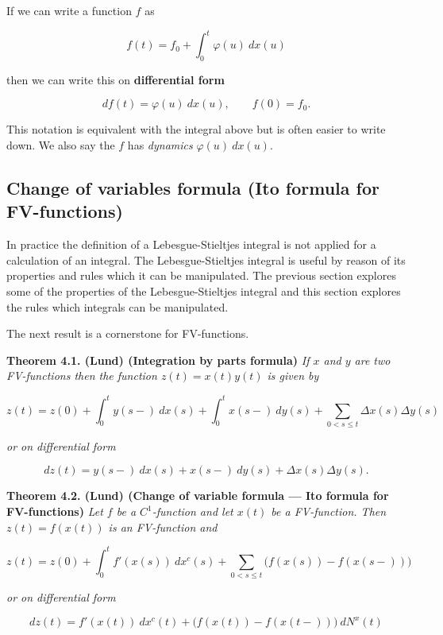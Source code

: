 \documentclass[a4paper,10pt,openany]{book}
\begin{document}
If we can write a function \(f\) as

\[
f(t)=f_0+\int_0^t\varphi(u)\ dx(u)
\]

then we can write this on \textbf{differential form}

\[
df(t)=\varphi(u)\ dx(u),\qquad f(0)=f_0.
\]

This notation is equivalent with the integral above but is often easier to write down. We also say the \(f\) has \emph{dynamics} \(\varphi(u)\ dx(u)\).

\hypertarget{change-of-variables-formula-ito-formula-for-fv-functions}{%
\subsection{Change of variables formula (Ito formula for FV-functions)}\label{change-of-variables-formula-ito-formula-for-fv-functions}}

In practice the definition of a Lebesgue-Stieltjes integral is not applied for a calculation of an integral. The Lebesgue-Stieltjes integral is useful by reason of its properties and rules which it can be manipulated. The previous section explores some of the properties of the Lebesgue-Stieltjes integral and this section explores the rules which integrals can be manipulated.

The next result is a cornerstone for FV-functions.

\textbf{Theorem 4.1. (Lund) (Integration by parts formula)} \emph{If \(x\) and \(y\) are two FV-functions then the function \(z(t)=x(t)y(t)\) is given by}

\[
z(t)=z(0)+\int_0^t y(s-)\ dx(s)+\int_0^t x(s-)\ dy(s)+\sum_{0<s\le t}\Delta x(s)\Delta y(s)
\]

\emph{or on differential form}

\[
dz(t)=y(s-)\ dx(s)+ x(s-)\ dy(s)+\Delta x(s)\Delta y(s).
\]

\textbf{Theorem 4.2. (Lund) (Change of variable formula --- Ito formula for FV-functions)} \emph{Let \(f\) be a \(C^1\)-function and let \(x(t)\) be a FV-function. Then \(z(t)=f(x(t))\) is an FV-function and}

\[
z(t)=z(0)+\int_0^tf'(x(s))\ dx^c(s)+\sum_{0<s\le t}\Big(f(x(s))-f(x(s-))\Big)
\]

\emph{or on differential form}

\[
dz(t)=f'(x(t))\ dx^c(t)+\Big(f(x(t))-f(x(t-))\Big)\ dN^x(t)
\]
\end{document}
